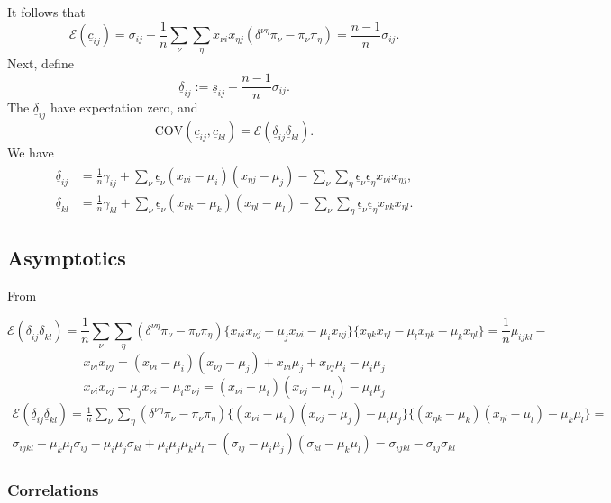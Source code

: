 \documentclass[
  12pt,
  letterpaper,
  DIV=11,
  numbers=noendperiod]{scrartcl}
\newcommand{\ul}[1]{\underline{#1}}
\begin{document}
It follows that \[
\mathcal{E}(\ul{c}_{ij})=\sigma_{ij}-\frac{1}{n}\sum_\nu\sum_\eta x_{\nu i}x_{\eta j}(\delta^{\nu\eta}\pi_\nu-\pi_\nu\pi_\eta)=\frac{n-1}{n}\sigma_{ij}.
\] Next, define \[
\ul{\delta}_{ij}:=\ul{s}_{ij}-\frac{n-1}{n}\sigma_{ij}.
\] The \(\ul{\delta}_{ij}\) have expectation zero, and \[
\text{COV}(\ul{c}_{ij},\ul{c}_{kl})=\mathcal{E}(\ul{\delta}_{ij}\ul{\delta}_{kl}).
\] We have \begin{subequations}
\begin{align}
\ul{\delta}_{ij}&=\frac{1}{n}\gamma_{ij}+\sum_\nu\ul{\epsilon}_\nu(x_{\nu i}-\mu_i)(x_{\eta j}-\mu_j)
-\sum_\nu\sum_\eta\ul{\epsilon}_\nu\ul{\epsilon}_\eta x_{\nu i}x_{\eta j},\label{eq-expd1}\\
\ul{\delta}_{kl}&=\frac{1}{n}\gamma_{kl}+\sum_\nu\ul{\epsilon}_\nu(x_{\nu k}-\mu_k)(x_{\eta l}-\mu_l)
-\sum_\nu\sum_\eta\ul{\epsilon}_\nu\ul{\epsilon}_\eta x_{\nu k}x_{\eta l}.\label{eq-expd2}
\end{align}
\end{subequations}

\subsection{Asymptotics}\label{asymptotics}

From

\[
\mathcal{E}(\ul{\delta}_{ij}\ul{\delta}_{kl})=\frac{1}{n}\sum_\nu\sum_\eta(\delta^{\nu\eta}\pi_\nu-\pi_\nu\pi_\eta)
\{x_{\nu i}x_{\nu j}
-\mu_jx_{\nu i}-\mu_ix_{\nu j}\}\{x_{\eta k}x_{\eta l}
-\mu_lx_{\eta k}-\mu_kx_{\eta l}\}=\frac{1}{n}\mu_{ijkl}-
\] \[
x_{\nu i}x_{\nu j}=(x_{\nu i}-\mu_i)(x_{\nu j}-\mu_j)+x_{\nu i}\mu_j+x_{\nu j}\mu_i-\mu_i\mu_j
\] \[x_{\nu i}x_{\nu j}
-\mu_jx_{\nu i}-\mu_ix_{\nu j}=(x_{\nu i}-\mu_i)(x_{\nu j}-\mu_j)-\mu_i\mu_j
\] \begin{multline}
\mathcal{E}(\ul{\delta}_{ij}\ul{\delta}_{kl})=\frac{1}{n}\sum_\nu\sum_\eta(\delta^{\nu\eta}\pi_\nu-\pi_\nu\pi_\eta)
\{(x_{\nu i}-\mu_i)(x_{\nu j}-\mu_j)-\mu_i\mu_j\}\{(x_{\eta k}-\mu_k)(x_{\eta l}-\mu_l)-\mu_k\mu_l\}=\\
\sigma_{ijkl}-\mu_k\mu_l\sigma_{ij}-\mu_i\mu_j\sigma_{kl}+\mu_i\mu_j\mu_k\mu_l-(\sigma_{ij}-\mu_i\mu_j)(\sigma_{kl}-\mu_k\mu_l)=\sigma_{ijkl}-\sigma_{ij}\sigma_{kl}
\end{multline}

\subsubsection{Correlations}\label{correlations}
\end{document}
